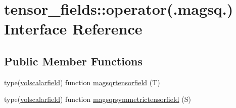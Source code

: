 \hypertarget{interfacetensor__fields_1_1operator_07_8magsq_8_08}{\section{tensor\-\_\-fields\-:\-:operator(.magsq.) Interface Reference}
\label{interfacetensor__fields_1_1operator_07_8magsq_8_08}
}
\subsection*{Public Member Functions}
\begin{DoxyCompactItemize}
\item 
type(\hyperlink{structtensor__fields_1_1volscalarfield}{volscalarfield}) function \hyperlink{interfacetensor__fields_1_1operator_07_8magsq_8_08_a936c6d36ac62b6735f160d089e20f871}{magsqrtensorfield} (T)
\item 
type(\hyperlink{structtensor__fields_1_1volscalarfield}{volscalarfield}) function \hyperlink{interfacetensor__fields_1_1operator_07_8magsq_8_08_ab1d35dd9db13c94b8d0b35852c8e6ab2}{magsqrsymmetrictensorfield} (S)
\end{DoxyCompactItemize}


